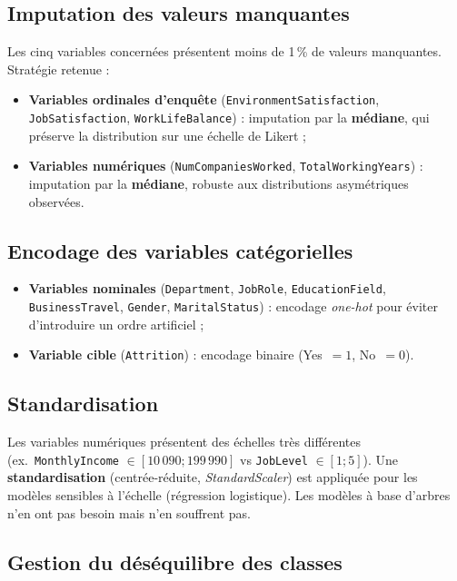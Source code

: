 \subsection{Imputation des valeurs manquantes}

Les cinq variables concernées présentent moins de 1\,\% de valeurs manquantes. Stratégie retenue :
\begin{itemize}
    \item \textbf{Variables ordinales d'enquête} (\texttt{EnvironmentSatisfaction}, \texttt{JobSatisfaction}, \texttt{WorkLifeBalance}) : imputation par la \textbf{médiane}, qui préserve la distribution sur une échelle de Likert ;
    \item \textbf{Variables numériques} (\texttt{NumCompaniesWorked}, \texttt{TotalWorkingYears}) : imputation par la \textbf{médiane}, robuste aux distributions asymétriques observées.
\end{itemize}

\subsection{Encodage des variables catégorielles}

\begin{itemize}
    \item \textbf{Variables nominales} (\texttt{Department}, \texttt{JobRole}, \texttt{EducationField}, \texttt{BusinessTravel}, \texttt{Gender}, \texttt{MaritalStatus}) : encodage \textit{one-hot} pour éviter d'introduire un ordre artificiel ;
    \item \textbf{Variable cible} (\texttt{Attrition}) : encodage binaire (Yes~$= 1$, No~$= 0$).
\end{itemize}

\subsection{Standardisation}

Les variables numériques présentent des échelles très différentes (ex.\ \texttt{MonthlyIncome} $\in [10\,090 ; 199\,990]$ vs \texttt{JobLevel} $\in [1 ; 5]$). Une \textbf{standardisation} (centrée-réduite, \textit{StandardScaler}) est appliquée pour les modèles sensibles à l'échelle (régression logistique). Les modèles à base d'arbres n'en ont pas besoin mais n'en souffrent pas.

\subsection{Gestion du déséquilibre des classes}

